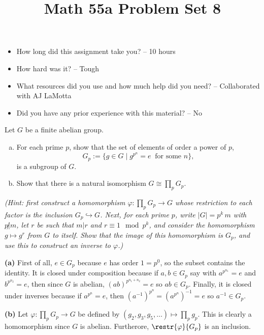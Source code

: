 \documentclass[11pt,letterpaper]{article}
\title{\textbf{Math 55a Problem Set 8}}
\begin{document}
\maketitle
\setcounter{page}{0}
\thispagestyle{empty}

\begin{itemize}
  \item How long did this assignment take you? -- 10 hours
  \item How hard was it? -- Tough
  \item What resources did you use and how much help did you need? -- Collaborated with AJ LaMotta
  \item Did you have any prior experience with this material? -- No
\end{itemize}

\pagebreak
\begin{problem}
Let $G$ be a finite abelian group.

\begin{enumerate} [(a)]
  \item For each prime $p$, show that the set of elements of order a power of $p$, 
    \[G_p := \{ g \in G \mid g^{p^n} = e \ \text{ for some } n \},\]
    is a subgroup of $G$.
  \item Show that there is a natural isomorphism $G\cong \prod_p G_p$.
\end{enumerate}
\end{problem}

\textit{(Hint: first construct a homomorphism $\varphi: \prod_p G_p\to G$ whose
restriction to each factor is the inclusion $G_p\hookrightarrow G$.
Next, for each prime $p$, write $|G|=p^k\,m$ with $p\! \not| m$, let
$r$ be such that $m|r$ and $r\equiv 1\mod p^k$, and consider the
homomorphism $g\mapsto g^r$ from $G$ to itself. Show that the image of
this homomorphism is $G_p$, and use this to construct an inverse to $\varphi$.)}

\textbf{(a)} First of all, $e\in G_p$ because $e$ has order $1=p^0$, so the subset contains the identity. It is closed under composition because if $a,b\in G_p$ say with $a^{p^{n_1}}=e$ and $b^{p^{n_2}}=e$, then since $G$ is abelian, $(ab)^{p^{n_1+n_2}}=e$ so $ab\in G_p$. Finally, it is closed under inverses because if  $a^{p^n}=e$, then  $(a^{-1})^{p^n}=\left(a^{p^{n}}\right)^{-1}=e$ so $a^{-1}\in G_p$.

\textbf{(b)} Let $\varphi : \prod_p G_p \to G$ be defined by $(g_2, g_3, g_5, \ldots) \mapsto \prod_p g_p$. This is clearly a homomorphism since $G$ is abelian. Furtherore, $\restr{\varphi}{G_p}$ is an inclusion.  
\end{document}

